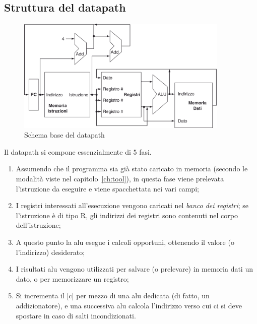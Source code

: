 \documentclass[class=book, crop=false, oneside]{standalone}
\begin{document}
\subsection{Struttura del datapath}
\begin{figure}[H]
	\centering
	\includegraphics[width=0.9\textwidth,keepaspectratio]{datap_1}
	\caption{Schema base del datapath}
\end{figure}
Il datapath si compone essenzialmente di 5 fasi.
\begin{enumerate}
  \item Assumendo che il programma sia già stato caricato in memoria (secondo le modalità viste nel capitolo~\ref{ch:tool}), in questa fase viene prelevata l'istruzione da eseguire e viene spacchettata nei vari campi;
  \item I registri interessati all'esecuzione vengono caricati nel \emph{banco dei registri}; se l'istruzione è di tipo R, gli indirizzi dei registri sono contenuti nel corpo dell'istruzione;
  \item A questo punto la \acrshort{alu} esegue i calcoli opportuni, ottenendo il valore (o l'indirizzo) desiderato;
  \item I risultati \acrshort{alu} vengono utilizzati per salvare (o prelevare) in memoria dati un dato, o per memorizzare un registro;
  \item Si incrementa il \acrshort{[c]} per mezzo di una \acrshort{alu} dedicata (di fatto, un addizionatore), e una successiva \acrshort{alu} calcola l’indirizzo verso cui ci si deve spostare in caso di salti incondizionati.
\end{enumerate}
\end{document}

